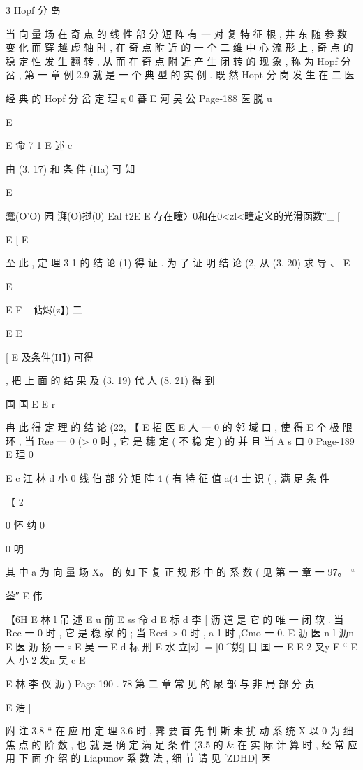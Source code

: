 {{{{{{{{{{{{{{{{{{3 Hopf 分 岛

当 向 量 场 在 奇 点 的 线 性 部 分 短 阵 有 一 对 复 特 征 根 , 井 东 随 参
数 变 化 而 穿 越 虚 轴 时 , 在 奇 点 附 近 的 一 个 二 维 中 心 流 形 上 , 奇 点 的
稳 定 性 发 生 翻 转 , 从 而 在 奇 点 附 近 产 生 闭 转 的 现 象 , 称 为 Hopf 分
岔 , 第 一 章 例 2.9 就 是 一 个 典 型 的 实 例 . 既 然 Hopt 分 岗 发 生 在 二
医

经 典 的 Hopf 分 岔 定 理
g
0 蕃 E 河 吴 公
Page-188
医 脱 u

E

E 命 7 1 E 述 c

由 (3. 17) 和 条 件 (Ha) 可 知

E

蠢(O'O) 园 湃(O)挝(0) Eal t2E
E 存在疃〉0和在0<zl<疃定义的光滑函数″_
[

E [ E

至 此 , 定 理 3 1 的 结 论 (1) 得 证 . 为 了 证 明 结 论 (2, 从 (3. 20) 求 导 、
E

E

E
F +萜烬(z】) 二

E
E

[
E 及条件(H】) 可得

, 把 上 面 的 结 果 及 (3. 19) 代 人 (8. 21) 得 到

国 国 E
E r

冉 此 得 定 理 的 结 论 (22, 【
E 招 医
E 人
一 0 的 邻 域 口 , 使 得
E
个 极 限 环 , 当 Ree 一 0 (> 0 时 , 它 是 穗 定 ( 不 稳 定 ) 的 并 且 当 A
s 口
0
Page-189
E 理 0

E c 江 林 d 小 0
线 伯 部 分 矩 阵 4 ( 有 特 征 值 a(4 士 识 ( , 满 足 条 件

【 2

0 怀 纳 0

0 明

其 中 a 为 向 量 场 X。 的 如 下 复 正 规 形 中 的 系 数 ( 见 第 一 章
一 97。 “

蓥″ E 伟

【6H
E 林 l 吊 述
E u 前
E ss 命 d
E 标 d 李
[ 沥
道 是 它 的 唯 一 闭 软 . 当 Rec 一 0 时 , 它 是 稳 家 的 ; 当 Reci > 0 时 ,
a
1
时 ,Cmo 一 0.
E 沥 医 n l 沥n
E 医 沥 扬 一 s
E 吴 一
E d 标 刑
E 水
立[z〕= [0 ^姚] 目 国
一 E E 2 叉y E “
E 人 小 2 发n 吴 c
E

E 林 李 仪 沥 )
Page-190
. 78 第 二 章 常 见 的 尿 部 与 非 局 部 分 责

E 浩 ]

附 注 3.8 “ 在 应 用 定 理 3.6 时 , 霁 要 首 先 判 斯 未 扰 动 系 统 X
以 0 为 细 焦 点 的 阶 数 , 也 就 是 确 定 满 足 条 件 (3.5 的 & 在 实 际 计
算 时 , 经 常 应 用 下 面 介 绍 的 Liapunov 系 数 法 , 细 节 请 见 [ZDHD]
医

}}}}}}}}}}}}}}}}}}
